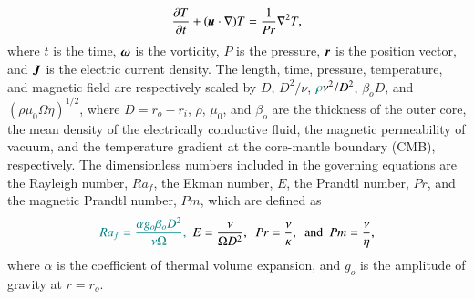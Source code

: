 %
\begin{equation}
\frac{\partial T}{\partial t} 
 + ( \mbox{\boldmath$u$} \cdot \nabla ) T =
 \frac{1}{Pr} \nabla^2 T ,
\label{eq:heat}
\end{equation}
%
where $t$ is the time, $\mbox{\boldmath$\omega$}$ is the vorticity, $P$ is the pressure, $\mbox{\boldmath$r$}$ is the position vector, and $\mbox{\boldmath$J$}$ is the electric current density.
The length, time, pressure, temperature, and magnetic field are respectively scaled by $D$, $D^2/\nu$, ${\color{teal}\rho} \nu^2 /D^2$, $\beta_o D$, and $(\rho \mu_0 \Omega \eta )^{1/2}$,
where $D = r_o - r_i$, $\rho$, $\mu_0$, and $\beta_o$ are the thickness of the outer core, the mean density of the {\color{teal}electrically} conductive fluid, the magnetic permeability of vacuum, and the temperature gradient at the core-mantle boundary (CMB), respectively.
The dimensionless numbers included in the governing equations are the Rayleigh number, $Ra_f$, the Ekman number, $E$, the Prandtl number, $Pr$, and the magnetic Prandtl number, $Pm$, which are defined as
%
\begin{equation}
{\color{teal}Ra_f = \frac{\alpha g_o \beta_o D^{2}}{\nu \Omega},}~~
E = \frac{\nu}{\Omega D^2},~~
Pr = \frac{\nu}{\kappa},~~ \mbox{and \ }
Pm = \frac{\nu}{\eta},
\label{eq:dimensionless_numbers}
\end{equation}
%
where $\alpha$ is the coefficient of thermal volume expansion, and $g_o$ is the amplitude of gravity at $r = r_o$.

